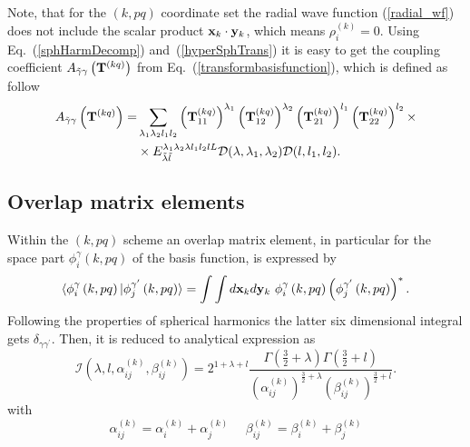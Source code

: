 \documentclass[
12pt, %
oneside, %
english, %
onehalfspacing, %
headsepline, %
]{MastersDoctoralThesis} %
\begin{document}
Note, that for the $(k,pq)$ coordinate set the radial wave function (\ref{radial_wf}) does not include the scalar product ${\bf x}_k \cdot {\bf y}_k$, which means $\rho_i^{(k)}=0$.  
 Using Eq.~(\ref{sphHarmDecomp}) and~(\ref{hyperSphTrans}) it is easy to get the coupling coefficient $ A_{\tilde{\gamma} \gamma} \left( {\bf T}^{(kq)} \right) $ from Eq.~(\ref{transformbasisfunction}), which is defined as follow 
 \begin{align}
A_{\tilde{\gamma}\gamma}\left( {\bf T}^{(kq)} \right) = & \sum_{\lambda_1 \lambda_2 l_1 l_2} 
\left({\bf T}_{11}^{(kq)} \right)^{\lambda_1} 
\left({\bf T}_{12}^{(kq)} \right)^{\lambda_2} 
\left({\bf T}_{21}^{(kq)} \right)^{l_1} 
\left({\bf T}_{22}^{(kq)} \right)^{l_2} 
\times \nonumber
\\
& \times {E}^{\lambda_1 \lambda_2 \lambda l_1 l_2 l L}_{\tilde{\lambda} \tilde{l} } \mathcal{D}(\lambda,\lambda_1,\lambda_2) \mathcal{D}(l,l_1,l_2).    
\label{trans_coef}
\end{align}

\subsection{Overlap matrix elements}
Within the $\left(k, pq \right)$ scheme an overlap matrix element, in particular for the space part $ \phi_{i}^{\gamma}\left(k, pq \right)$ of the basis function, is expressed by
\begin{equation}
\langle \phi_{i}^{\gamma}\left(k, pq \right) \vert 
\phi_{j}^{\gamma^{\prime}}\left(k, pq \right) \rangle= \int \int d{\bf x}_k d{\bf y}_k ~\phi_{i}^{\gamma}\left(k, pq \right) \left( \phi_{j}^{\gamma^{\prime}}\left(k, pq \right) \right)^{*}.
\end{equation}
Following the properties of spherical harmonics the latter six dimensional integral gets $\delta_{\gamma \gamma^{\prime}}$. Then, it  is reduced to analytical expression as  
\begin{equation}
\mathcal{I} \left( \lambda,l,\alpha_{ij}^{(k)},\beta_{ij}^{(k)} \right)= 2^{1+\lambda+l}\frac{\Gamma \left( \frac{3}{2}+\lambda \right) \Gamma \left( \frac{3}{2}+l \right) }{ \left( \alpha_{ij}^{(k)} \right) ^{\frac{3}{2}+\lambda} \left( \beta_{ij}^{(k)} \right) ^{\frac{3}{2}+l}} .
\end{equation}
with 
\begin{equation}
\alpha_{ij}^{(k)}=\alpha_{i}^{(k)}+\alpha_{j}^{(k)}~~~~~~
\beta_{ij}^{(k)}=\beta_{i}^{(k)}+\beta_{j}^{(k)}
\end{equation}
\end{document}
